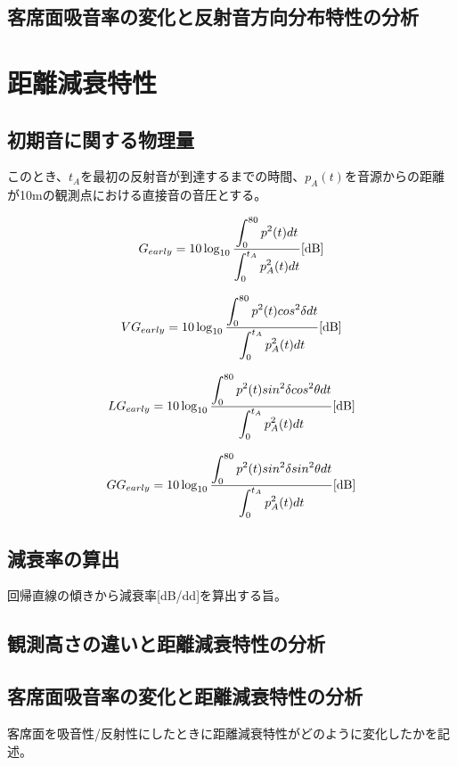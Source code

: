 \subsection{客席面吸音率の変化と反射音方向分布特性の分析}


\section{距離減衰特性}
\subsection{初期音に関する物理量}

このとき、$t_A$を最初の反射音が到達するまでの時間、$p_A(t)$を音源からの距離が10mの観測点における直接音の音圧とする。

\begin{equation}
  \label{eq:}
  G_{early} = 10\log_{10}{\frac{\displaystyle\int_0^{80}p^2(t)dt}{\displaystyle\int_0^{t_A}p_{A}^2(t)dt}} \textrm{[dB]}
\end{equation}

\begin{equation}
  \label{eq:}
  VG_{early} = 10\log_{10}{\frac{\displaystyle\int_0^{80}p^2(t)cos^2{\delta}dt}{\displaystyle\int_0^{t_A}p_{A}^2(t)dt}} \textrm{[dB]}
\end{equation}

\begin{equation}
  \label{eq:}
  LG_{early} = 10\log_{10}{\frac{\displaystyle\int_0^{80}p^2(t)sin^2{\delta}cos^2{\theta}dt}{\displaystyle\int_0^{t_A}p_{A}^2(t)dt}} \textrm{[dB]}
\end{equation}

\begin{equation}
  \label{eq:}
  GG_{early} = 10\log_{10}{\frac{\displaystyle\int_0^{80}p^2(t)sin^2{\delta}sin^2{\theta}dt}{\displaystyle\int_0^{t_A}p_{A}^2(t)dt}} \textrm{[dB]}
\end{equation}

\subsection{減衰率の算出}
回帰直線の傾きから減衰率[dB/dd]を算出する旨。
\subsection{観測高さの違いと距離減衰特性の分析}
\subsection{客席面吸音率の変化と距離減衰特性の分析}
客席面を吸音性/反射性にしたときに距離減衰特性がどのように変化したかを記述。

